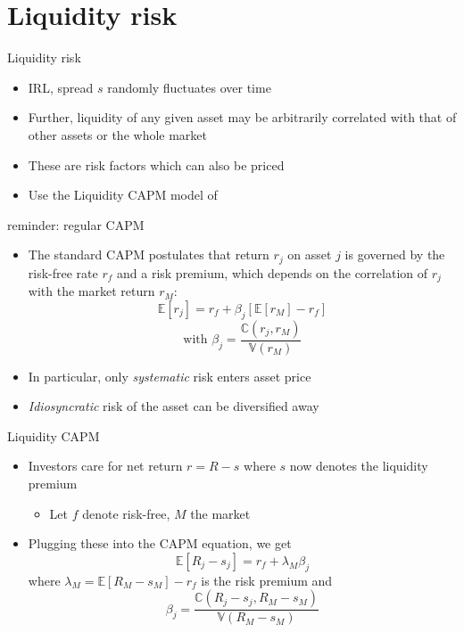 \documentclass[english,10pt
,aspectratio=169
]{beamer}
\begin{document}
\section{Liquidity risk}

\begin{frame}{Liquidity risk}
	\begin{itemize}
		\item IRL, spread $s$ randomly fluctuates over time
		\item Further, liquidity of any given asset may be arbitrarily correlated with that of other assets or the whole market
		\item These are risk factors which can also be priced
		\item Use the Liquidity CAPM model of \cite{acharya_asset_2005}
	\end{itemize}
\end{frame}


\begin{frame}{reminder: regular CAPM}
	\begin{itemize}
		\item The standard CAPM postulates that return $r_j$ on asset $j$ is governed by the risk-free rate $r_f$ and a risk premium, which depends on the correlation of $r_j$ with the market return $r_M$:
		\begin{equation*}
			\mathbb{E}[r_j] = r_f + \beta_j \left[ \mathbb{E}[r_M] - r_f \right]
		\end{equation*}
		\begin{equation*}
			\text{with } \beta_j = \frac{\mathbb{C}(r_j, r_M)}{\mathbb{V}(r_M)}
		\end{equation*}
		\item In particular, only \emph{systematic} risk enters asset price
		\item \emph{Idiosyncratic} risk of the asset can be diversified away
	\end{itemize}
\end{frame}


\begin{frame}{Liquidity CAPM}
	\begin{itemize}
		\item Investors care for net return $r=R-s$ where $s$ now denotes the liquidity premium
		\begin{itemize}
			\item Let $f$ denote risk-free, $M$ the market
		\end{itemize}
		\item Plugging these into the CAPM equation, we get
		\[
		\mathbb{E}[R_j-s_j]=r_f + \lambda_M \beta_j
		\]
		where $\lambda_M = \mathbb{E}[R_M-s_M]-r_f$ is the risk premium and
		\[
		\beta_j=\frac{\mathbb{C}(R_j-s_j, R_M-s_M)}{\mathbb{V}(R_M-s_M)}
		\]
	\end{itemize}
\end{frame}
\end{document}
